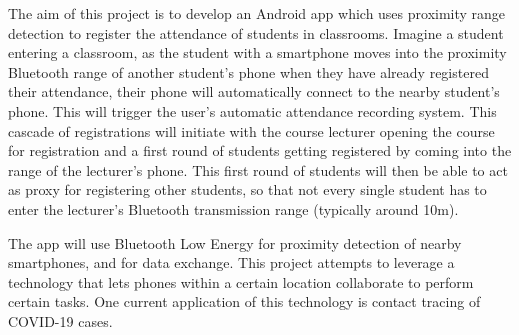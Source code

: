 \documentclass[../report.tex]{subfiles}
\begin{document}
The aim of this project is to develop an Android app which uses proximity range detection to register the attendance of students in classrooms. Imagine a student entering a classroom, as the student with a smartphone moves into the proximity Bluetooth range of another student’s phone when they have already registered their attendance, their phone will automatically connect to the nearby student's phone. This will trigger the user's automatic attendance recording system. This cascade of registrations will initiate with the course lecturer opening the course for registration and a first round of students getting registered by coming into the range of the lecturer's phone. This first round of students will then be able to act as proxy for registering other students, so that not every single student has to enter the lecturer's Bluetooth transmission range (typically around 10m).

The app will use Bluetooth Low Energy for proximity detection of nearby smartphones, and for data exchange. This project attempts to leverage a technology that lets phones within a certain location collaborate to perform certain tasks. One current application of this technology is contact tracing of COVID-19 cases.
\end{document}
